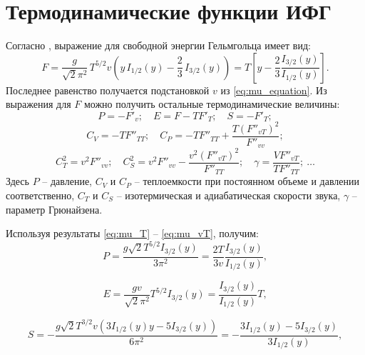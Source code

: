 \section{Термодинамические функции ИФГ}
Согласно \cite{kirzhnits:UFN:1975}, выражение для свободной энергии Гельмгольца имеет вид:
\begin{equation}
   \label{eq:helmholtz_potential}
   F = \frac{g}{\sqrt{2}\pi^2}\,  T^{5 / 2} v \left( y \, I_{1 /2} (y) - \frac{2}{3}\, I_{3 / 2} (y) \right)
   = T\left[y - \frac{2}{3}\frac{I_{3/2}(y)}{I_{1/2}(y)}\right].
\end{equation}
Последнее равенство получается подстановкой $v$ из \eqref{eq:mu_equation}.
Из выражения для $F$ можно получить остальные термодинамические величины:
\begin{equation}
    \label{eq:PES}
    P = -F'_v;\quad
    E = F - TF'_T;\quad
    S = -F'_T;
\end{equation}
\begin{equation}
    \label{eq:CVCP}
    C_V = -TF''_{TT};\quad
    C_P = -TF''_{TT} + \frac{T(F''_{vT})^2}{F''_{vv}};
\end{equation}
\begin{equation}
    \label{eq:CTCS}
    C_T^2 = v^2F''_{vv};\quad
    C_S^2 = v^2F''_{vv} - \frac{v^2(F''_{vT})^2}{F''_{TT}};\quad
    \gamma = \frac{VF''_{vT}}{TF''_{TT}};\ \ldots
\end{equation}
Здесь $P$ -- давление, $C_V$ и $C_P$ -- теплоемкости при постоянном объеме и давлении соответственно, $C_T$ и $C_S$ -- изотермическая и адиабатическая скорости звука, $\gamma$ -- параметр Грюнайзена.

Используя результаты \eqref{eq:mu_T} -- \eqref{eq:mu_vT}, получим:
\begin{equation}
   \label{eq:pressure}
   P = \frac{g \sqrt{2} T^{5 /2} I_{3 / 2}(y)}{3 \pi^{2}}
   = \frac{2T}{3v}\frac{I_{3/2}(y)}{I_{1/2}(y)},
\end{equation}

\begin{equation}
   \label{eq:energy}
   E = \frac{g v}{\sqrt{2}\pi^2} T^{5 /2} I_{3 / 2}(y)
   = \frac{I_{3/2}(y)}{I_{1/2}(y)}T,
\end{equation}

\begin{equation}
   \label{eq:entropy}
   S = -\frac{g\sqrt{2} T^{3 /2} v\left(3 I_{1 / 2}(y) y-5 I_{3 / 2}(y)\right)}{6 \pi^{2}}
   = -\frac{3I_{1/2}(y) - 5I_{3/2}(y)}{3I_{1/2}(y)},
\end{equation}

